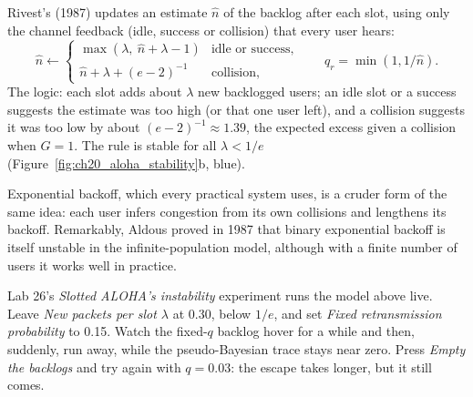 \begin{deeper}
Rivest's  (1987) updates an estimate $\hat n$ of the backlog after each
slot, using only the channel feedback (idle, success or collision) that every user hears:
\begin{equation}
\hat n\leftarrow
\begin{cases}
\max(\lambda,\ \hat n+\lambda-1) & \text{idle or success},\\
\hat n+\lambda+(e-2)^{-1} & \text{collision},
\end{cases}
\qquad q_r=\min(1,1/\hat n).
\end{equation}
The logic: each slot adds about $\lambda$ new backlogged users; an idle slot or a success suggests the
estimate was too high (or that one user left), and a collision suggests it was too low by about
$(e-2)^{-1}\approx1.39$, the expected excess given a collision when $G=1$. The rule is stable for all
$\lambda<1/e$ (Figure~\ref{fig:ch20_aloha_stability}b, blue).
\end{deeper}

Exponential backoff, which every practical system uses, is a cruder form of the same idea: each user
infers congestion from its own collisions and lengthens its backoff. Remarkably, Aldous proved in 1987
that binary exponential backoff is itself unstable in the infinite-population model, although with a
finite number of users it works well in practice.

\begin{tryit}
Lab 26's \emph{Slotted ALOHA's instability} experiment runs the model above live. Leave
\emph{New packets per slot $\lambda$} at 0.30, below $1/e$, and set \emph{Fixed retransmission
probability} to 0.15. Watch the fixed-$q$ backlog hover for a while and then, suddenly, run away,
while the pseudo-Bayesian trace stays near zero. Press \emph{Empty the backlogs} and try again with
$q=0.03$: the escape takes longer, but it still comes.
\end{tryit}


